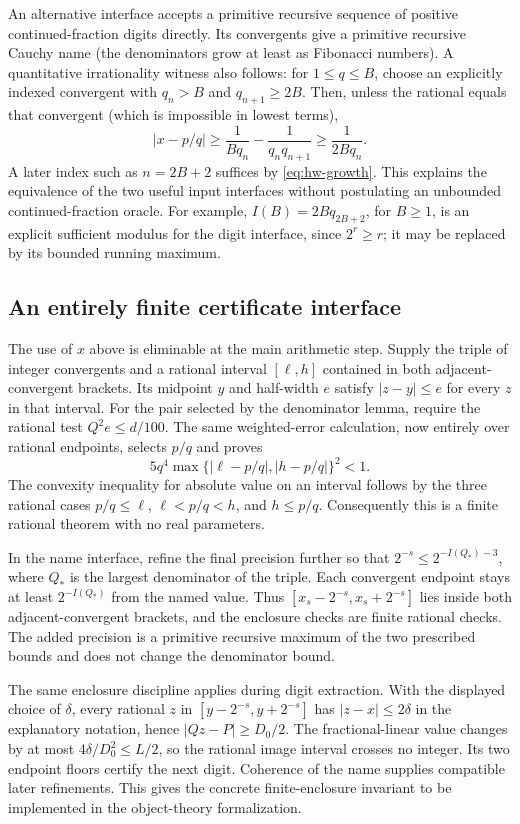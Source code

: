 An alternative interface accepts a primitive recursive sequence of positive
continued-fraction digits directly.  Its convergents give a primitive recursive
Cauchy name (the denominators grow at least as Fibonacci numbers).  A
quantitative irrationality witness also follows: for \(1\le q\le B\), choose
an explicitly indexed convergent with \(q_n>B\) and \(q_{n+1}\ge2B\).
Then, unless the rational equals that convergent (which is impossible in
lowest terms),
\[
 |x-p/q|\ge\frac1{Bq_n}-\frac1{q_nq_{n+1}}
 \ge\frac1{2Bq_n}.
\]
A later index such as \(n=2B+2\) suffices by \eqref{eq:hw-growth}.
This explains the equivalence of the two useful input interfaces without
postulating an unbounded continued-fraction oracle.
For example, $I(B)=2Bq_{2B+2}$, for $B\ge1$, is an explicit sufficient
modulus for the digit interface, since $2^r\ge r$; it may be replaced
by its bounded running maximum.

\subsection{An entirely finite certificate interface}

The use of $x$ above is eliminable at the main arithmetic step.
Supply the triple of integer convergents and a rational interval
$[\ell,h]$ contained in both adjacent-convergent brackets.  Its midpoint
$y$ and half-width $e$ satisfy $|z-y|\le e$ for every $z$ in that interval.
For the pair selected by the denominator lemma, require the rational
test $Q^2e\le d/100$.  The same weighted-error calculation, now entirely
over rational endpoints, selects $p/q$ and proves
\[
 5q^4\max\{|\ell-p/q|,|h-p/q|\}^2<1.
\]
The convexity inequality for absolute value on an interval follows by
the three rational cases $p/q\le\ell$, $\ell<p/q<h$, and $h\le p/q$.
Consequently this is a finite rational theorem with no real parameters.

In the name interface, refine the final precision further so that
$2^{-s}\le2^{-I(Q_*)-3}$, where $Q_*$ is the largest denominator of
the triple.  Each convergent endpoint stays at least $2^{-I(Q_*)}$
from the named value.  Thus $[x_s-2^{-s},x_s+2^{-s}]$ lies inside both
adjacent-convergent brackets, and the enclosure checks are finite rational
checks.  The added precision is a primitive recursive maximum of the
two prescribed bounds and does not change the denominator bound.

The same enclosure discipline applies during digit extraction.  With
the displayed choice of $\delta$, every rational $z$ in
$[y-2^{-s},y+2^{-s}]$ has $|z-x|\le2\delta$ in the explanatory
notation, hence $|Qz-P|\ge D_0/2$.  The fractional-linear value changes
by at most $4\delta/D_0^2\le L/2$, so the rational image interval
crosses no integer.  Its two endpoint floors certify the next digit.
Coherence of the name supplies compatible later refinements.  This
gives the concrete finite-enclosure invariant to be implemented in
the object-theory formalization.

